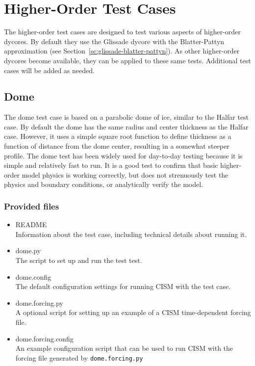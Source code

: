 
\section{Higher-Order Test Cases}
\label{sc:ho-tests}

The higher-order test cases are designed to test various aspects of higher-order dycores.
By default they use the Glissade dycore with the Blatter-Pattyn approximation 
(see Section~\ref{sc:glissade-blatter-pattyn}).
As other higher-order dycores become available, they can be applied
to these same tests. Additional test cases will be added as needed.

\subsection{Dome}
The dome test case is based on a parabolic dome of ice, similar to the Halfar test case.
By default the dome has the same radius and center thickness as the Halfar case.
However, it uses a simple square root function to define thickness as a function 
of distance from the dome center, resulting in a somewhat steeper profile.  
The dome test has been widely used for day-to-day testing
because it is simple and relatively fast to run.  It is a good test
to confirm that basic higher-order model physics is working correctly, but does
not strenuously test the physics and boundary conditions, or analytically verify the model.

\subsubsection{Provided files}

\begin{itemize}
	\item README \\
		Information about the test case, including technical details about running it.
	\item dome.py \\
		The script to set up and run the test test.
 	 \item dome.config \\
  		The default configuration settings for running CISM with the test case.
	\item dome.forcing.py \\
		A optional script for setting up an example of a CISM time-dependent forcing file.
  	\item dome.forcing.config \\
  		An example configuration script that can be used to run CISM with the forcing file
  		generated by \texttt{dome.forcing.py}
\end{itemize}


